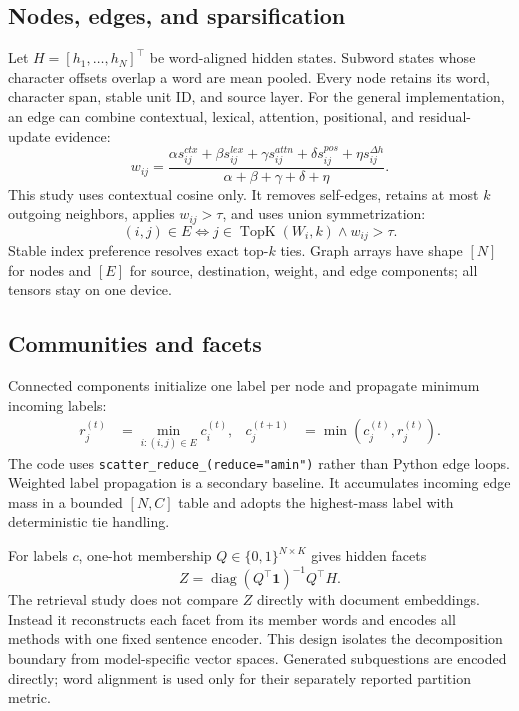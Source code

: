 \documentclass[11pt]{article}
\begin{document}
\subsection{Nodes, edges, and sparsification}
Let $H=[h_1,\ldots,h_N]^\top$ be word-aligned hidden states. Subword states whose character offsets overlap a word are mean pooled. Every node retains its word, character span, stable unit ID, and source layer. For the general implementation, an edge can combine contextual, lexical, attention, positional, and residual-update evidence:
\begin{equation}
w_{ij}=\frac{\alpha s^{ctx}_{ij}+\beta s^{lex}_{ij}+\gamma s^{attn}_{ij}+\delta s^{pos}_{ij}+\eta s^{\Delta h}_{ij}}{\alpha+\beta+\gamma+\delta+\eta}.
\end{equation}
This study uses contextual cosine only. It removes self-edges, retains at most $k$ outgoing neighbors, applies $w_{ij}>\tau$, and uses union symmetrization:
\begin{equation}
(i,j)\in E \Longleftrightarrow j\in\operatorname{TopK}(W_i,k)\land w_{ij}>\tau.
\end{equation}
Stable index preference resolves exact top-$k$ ties. Graph arrays have shape $[N]$ for nodes and $[E]$ for source, destination, weight, and edge components; all tensors stay on one device.

\subsection{Communities and facets}
Connected components initialize one label per node and propagate minimum incoming labels:
\begin{align}
r_j^{(t)}&=\min_{i:(i,j)\in E}c_i^{(t)},&
c_j^{(t+1)}&=\min(c_j^{(t)},r_j^{(t)}).
\end{align}
The code uses \texttt{scatter\_reduce\_(reduce="amin")} rather than Python edge loops. Weighted label propagation is a secondary baseline. It accumulates incoming edge mass in a bounded $[N,C]$ table and adopts the highest-mass label with deterministic tie handling.

For labels $c$, one-hot membership $Q\in\{0,1\}^{N\times K}$ gives hidden facets
\begin{equation}
Z=\operatorname{diag}(Q^\top\mathbf{1})^{-1}Q^\top H.
\end{equation}
The retrieval study does not compare $Z$ directly with document embeddings. Instead it reconstructs each facet from its member words and encodes all methods with one fixed sentence encoder. This design isolates the decomposition boundary from model-specific vector spaces. Generated subquestions are encoded directly; word alignment is used only for their separately reported partition metric.
\end{document}
